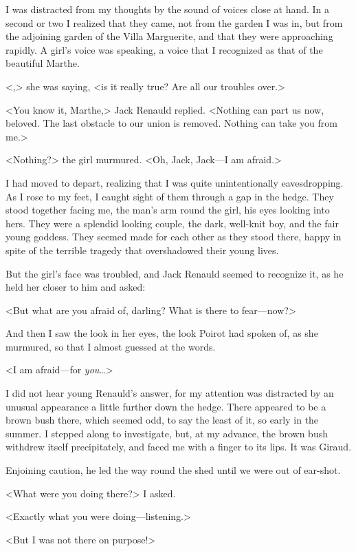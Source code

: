  I was distracted from my thoughts by the sound of voices close at hand. In a second or two I realized that they came, not from the garden I was in, but from the adjoining garden of the Villa Marguerite, and that they were approaching rapidly. A girl's voice was speaking, a voice that I recognized as that of the beautiful Marthe. 

 <,> she was saying, <is it really true? Are all our troubles over.> 

 <You know it, Marthe,> Jack Renauld replied. <Nothing can part us now, beloved. The last obstacle to our union is removed. Nothing can take you from me.> 

 <Nothing?> the girl murmured. <Oh, Jack, Jack—I am afraid.> 

 I had moved to depart, realizing that I was quite unintentionally eavesdropping. As I rose to my feet, I caught sight of them through a gap in the hedge. They stood together facing me, the man's arm round the girl, his eyes looking into hers. They were a splendid looking couple, the dark, well-knit boy, and the fair young goddess. They seemed made for each other as they stood there, happy in spite of the terrible tragedy that overshadowed their young lives. 

 But the girl's face was troubled, and Jack Renauld seemed to recognize it, as he held her closer to him and asked: 

 <But what are you afraid of, darling? What is there to fear—now?> 

 And then I saw the look in her eyes, the look Poirot had spoken of, as she murmured, so that I almost guessed at the words. 

 <I am afraid—for \emph{you}\dots> 

 I did not hear young Renauld's answer, for my attention was distracted by an unusual appearance a little further down the hedge. There appeared to be a brown bush there, which seemed odd, to say the least of it, so early in the summer. I stepped along to investigate, but, at my advance, the brown bush withdrew itself precipitately, and faced me with a finger to its lips. It was Giraud. 

 Enjoining caution, he led the way round the shed until we were out of ear-shot. 

 <What were you doing there?> I asked. 

 <Exactly what you were doing—listening.> 

 <But I was not there on purpose!> 

